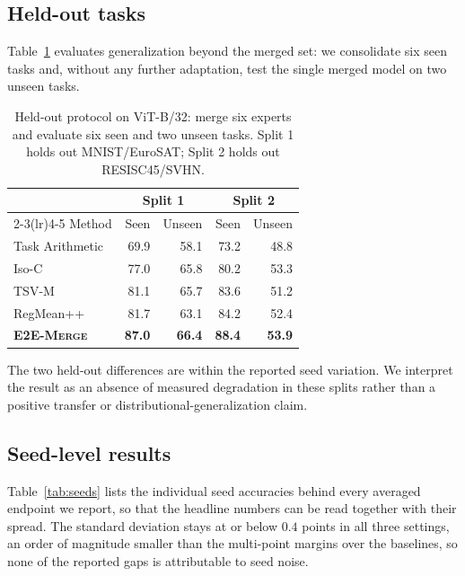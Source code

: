 \documentclass[letterpaper]{article} %
\newcommand{\method}{\textup{\textsc{E2E-Merge}}\xspace}
\theoremstyle{plain}
\theoremstyle{definition}
\begin{document}
\subsection{Held-out tasks}
\label{app:heldout}
Table~\ref{tab:heldout-app} evaluates generalization beyond the merged set: we consolidate six seen tasks and, without any further adaptation, test the single merged model on two unseen tasks.

\begin{table}[tb]
\centering
{\small
\begin{tabular*}{\columnwidth}{@{\extracolsep{\fill}}lrrrr}
\toprule
& \multicolumn{2}{c}{Split 1} & \multicolumn{2}{c}{Split 2} \\
\cmidrule(lr){2-3}\cmidrule(lr){4-5}
Method & Seen & Unseen & Seen & Unseen \\
\midrule
Task Arithmetic & 69.9 & 58.1 & 73.2 & 48.8 \\
Iso-C & 77.0 & 65.8 & 80.2 & 53.3 \\
TSV-M & 81.1 & 65.7 & 83.6 & 51.2 \\
RegMean++ & 81.7 & 63.1 & 84.2 & 52.4 \\
\textbf{\method} & \textbf{87.0} & \textbf{66.4} & \textbf{88.4} & \textbf{53.9} \\
\bottomrule
\end{tabular*}
}
\caption{Held-out protocol on ViT-B/32: merge six experts and evaluate six seen and two
unseen tasks.
Split 1 holds out MNIST/EuroSAT; Split 2 holds out RESISC45/SVHN.}
\label{tab:heldout-app}
\end{table}

The two held-out differences are within the reported seed variation.
We interpret the result as an absence of measured degradation in these splits rather than a positive transfer or distributional-generalization claim.

\subsection{Seed-level results}
\label{app:seeds}
Table~\ref{tab:seeds} lists the individual seed accuracies behind every averaged endpoint we report, so that the headline numbers can be read together with their spread.
The standard deviation stays at or below $0.4$ points in all three settings, an order of magnitude smaller than the multi-point margins over the baselines, so none of the reported gaps is attributable to seed noise.
\end{document}
